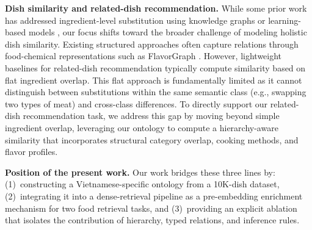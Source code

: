 \textbf{Dish similarity and related-dish recommendation.}
While some prior work has addressed ingredient-level substitution using knowledge graphs \cite{shirai2021identifying} or learning-based models \cite{fatemi2023learning}, our focus shifts toward the broader challenge of modeling holistic dish similarity. Existing structured approaches often capture relations through food-chemical representations such as FlavorGraph \cite{park2021flavorgraph}. However, lightweight baselines for related-dish recommendation typically compute similarity based on flat ingredient overlap. This flat approach is fundamentally limited as it cannot distinguish between substitutions within the same semantic class (e.g., swapping two types of meat) and cross-class differences. To directly support our related-dish recommendation task, we address this gap by moving beyond simple ingredient overlap, leveraging our ontology to compute a hierarchy-aware similarity that incorporates structural category overlap, cooking methods, and flavor profiles.

\textbf{Position of the present work.}
Our work bridges these three lines by: (1)~constructing a Vietnamese-specific ontology from a 10K-dish dataset, (2)~integrating it into a dense-retrieval pipeline as a pre-embedding enrichment mechanism for two food retrieval tasks, and (3)~providing an explicit ablation that isolates the contribution of hierarchy, typed relations, and inference rules.

